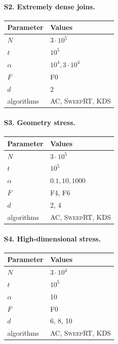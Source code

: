 \documentclass[11pt]{article}
\newcommand{\AC}{\textsc{AC}}
\newcommand{\SweepRT}{\textsc{SweepRT}}
\newcommand{\KDS}{\textsc{KDS}}
\begin{document}
\paragraph{S2. Extremely dense joins.}
\begin{center}
\begin{tabularx}{0.82\linewidth}{@{}lY@{}}
\toprule
Parameter & Values \\
\midrule
$N$ & $3\cdot10^5$ \\
$t$ & $10^5$ \\
$\alpha$ & $10^4,3\cdot10^4$ \\
$F$ & F0 \\
$d$ & 2 \\
algorithms & \AC, \SweepRT, \KDS \\
\bottomrule
\end{tabularx}
\end{center}

\paragraph{S3. Geometry stress.}
\begin{center}
\begin{tabularx}{0.82\linewidth}{@{}lY@{}}
\toprule
Parameter & Values \\
\midrule
$N$ & $3\cdot10^5$ \\
$t$ & $10^5$ \\
$\alpha$ & $0.1,10,1000$ \\
$F$ & F4, F6 \\
$d$ & 2, 4 \\
algorithms & \AC, \SweepRT, \KDS \\
\bottomrule
\end{tabularx}
\end{center}

\paragraph{S4. High-dimensional stress.}
\begin{center}
\begin{tabularx}{0.82\linewidth}{@{}lY@{}}
\toprule
Parameter & Values \\
\midrule
$N$ & $3\cdot10^4$ \\
$t$ & $10^5$ \\
$\alpha$ & 10 \\
$F$ & F0 \\
$d$ & 6, 8, 10 \\
algorithms & \AC, \SweepRT, \KDS \\
\bottomrule
\end{tabularx}
\end{center}
\end{document}

